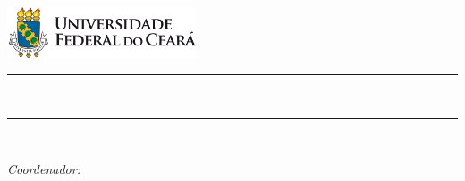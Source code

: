 \begin{titlepage}
	\newcommand{\HRule}{\rule{\linewidth}{0.5mm}}
	\begin{minipage}{0.47\textwidth}
		\begin{flushleft}
			\noindent
			\includegraphics[height = 1.5cm]{./figures/UFC}\hfill
		\end{flushleft}
	\end{minipage}

	\vspace*{5.0cm}
	\centering
	\HRule\\[0.4cm]
	\HRule\\[1.5cm]

	\begin{minipage}{\textwidth}
		\begin{flushleft}
			\large
			\emph{Coordenador: } \supervisor\\
		\end{flushleft}
	\end{minipage}

	\vfill %
	\firstpagefoot\\[1cm]
\end{titlepage}
